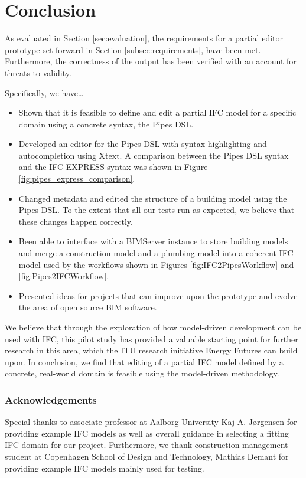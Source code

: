 \section{Conclusion}
\label{sec:conclusion}
As evaluated in Section \ref{sec:evaluation}, the requirements for a partial editor prototype set forward in Section \ref{subsec:requirements}, have been met. Furthermore, the correctness of the output has been verified with an account for threats to validity.

Specifically, we have\ldots

\begin{itemize}
\item Shown that it is feasible to define and edit a partial IFC model for a specific domain using a concrete syntax, the Pipes DSL.
\item Developed an editor for the Pipes DSL with syntax highlighting and autocompletion using Xtext. A comparison between the Pipes DSL syntax and the IFC-EXPRESS syntax was shown in Figure \ref{fig:pipes_express_comparison}.
\item Changed metadata and edited the structure of a building model using the Pipes DSL. To the extent that all our tests run as expected, we believe that these changes happen correctly.
\item Been able to interface with a BIMServer instance to store building models and merge a construction model and a plumbing model into a coherent IFC model used by the workflows shown in Figures \ref{fig:IFC2PipesWorkflow} and \ref{fig:Pipes2IFCWorkflow}.
\item Presented ideas for projects that can improve upon the prototype and evolve the area of open source BIM software.
\end{itemize}

We believe that through the exploration of how model-driven development can be used with IFC, this pilot study has provided a valuable starting point for further research in this area, which the ITU research initiative Energy Futures can build upon. In conclusion, we find that editing of a partial IFC model defined by a concrete, real-world domain is feasible using the model-driven methodology.

\subsubsection{Acknowledgements} Special thanks to associate professor at Aalborg University Kaj A. Jørgensen for providing example IFC models as well as overall guidance in selecting a fitting IFC domain for our project. Furthermore, we thank construction management student at Copenhagen School of Design and Technology, Mathias Demant for providing example IFC models mainly used for testing.